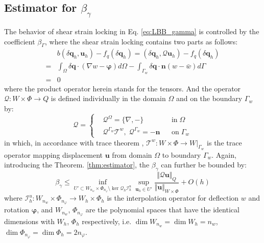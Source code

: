 \subsection{Estimator for $\beta_\gamma$}
The behavior of shear strain locking in Eq. \eqref{eq:LBB_gamma} is controlled by the coefficient $\beta_\Gamma$, where the shear strain locking contains two parts as follows: 
\begin{equation}
    \begin{aligned}
        &b(\delta \boldsymbol q_h, \boldsymbol u_h) - f_q(\delta \boldsymbol q_h)  = (\delta \boldsymbol q_h, \mathcal Q \boldsymbol u_h) - f_q(\delta \boldsymbol q_h)\\
        =& \int_\Omega \delta \boldsymbol q \cdot (\nabla w - \boldsymbol \varphi) d\Omega - \int_{\Gamma_w} \delta \boldsymbol q \cdot \boldsymbol n (w-\bar w)d\Gamma \\
        =& 0
    \end{aligned}
\end{equation}
where the product operator herein stands for the tensors. And the operator $\mathcal Q:W\times\Phi\rightarrow Q$ is defined individually in the domain $\Omega$ and on the boundary $\Gamma_w$ by:
\begin{equation}\label{eq:mathcal_Q}
\mathcal Q = \left\{
    \begin{aligned}
        &\mathcal Q^\Omega = \{\nabla, -\} & & \text{in}\;\Omega \\
        &\mathcal Q^{\Gamma_w}\mathcal T^w, \;\mathcal Q^{\Gamma_w} = -\boldsymbol n & & \text{on}\;\Gamma_w
    \end{aligned}
\right.
\end{equation}
in which, in accordance with trace theorem \cite{}, $\mathcal T^w:W\times\Phi\rightarrow W\vert_{\Gamma_w}$ is the trace operator mapping displacement $\boldsymbol u$ from domain $\Omega$ to boundary $\Gamma_w$. 
Again, introducing the Theorem. \ref{thm:estimator}, the $\beta_\gamma$ can further be bounded by:
\begin{equation}\label{eq:beta_gamma}
\beta_\gamma\le\inf_{U'\subset W_{n_w}\times \Phi_{n_\varphi}\setminus \ker \mathcal Q_h\mathcal I_h^u} \sup_{\boldsymbol u_h \in U'}
\frac{\Vert \mathcal Q \boldsymbol u\Vert_Q}{\Vert \boldsymbol u \Vert_{W\times \Phi}} + O(h)
\end{equation}
where $\mathcal I_h^u: W_{n_w}\times\Phi_{n_\varphi}\rightarrow W_h\times\Phi_h$ is the interpolation operator for deflection $w$ and rotation $\boldsymbol \varphi$, 
and $W_{n_w}$, $\Phi_{n_\varphi}$ are the polynomial spaces that have the identical dimensions with $W_h$, $\Phi_h$ respectively,
i.e. $\dim W_{n_w} = \dim W_h = n_w$, $\dim \Phi_{n_\varphi} = \dim \Phi_h = 2n_\varphi$.

